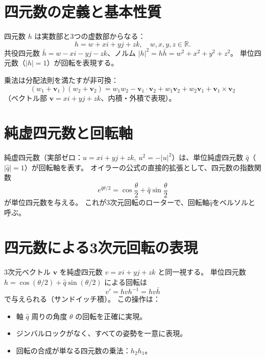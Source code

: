 \documentclass[dvipdfmx,a4paper]{jsbook}
\theoremstyle{definition}
\theoremstyle{remark}
\begin{document}
\section{四元数の定義と基本性質}
\label{sec:quaternion-definition}

四元数 $h$ は実数部と3つの虚数部からなる：
\begin{equation}
  h = w + xi + yj + zk, \quad w,x,y,z \in \mathbb{R}.
\end{equation}
共役四元数 $\bar{h} = w - xi - yj - zk$、ノルム $|h|^2 = h\bar{h} = w^2 + x^2 + y^2 + z^2$。
単位四元数（$|h|=1$）が回転を表現する。

乗法は分配法則を満たすが非可換：
\begin{equation}
  (w_1 + \mathbf{v}_1)(w_2 + \mathbf{v}_2) = w_1 w_2 - \mathbf{v}_1 \cdot \mathbf{v}_2 + w_1 \mathbf{v}_2 + w_2 \mathbf{v}_1 + \mathbf{v}_1 \times \mathbf{v}_2
\end{equation}
（ベクトル部 $\mathbf{v} = xi + yj + zk$、内積・外積で表現）。

\section{純虚四元数と回転軸}
\label{sec:pure-quaternion}

純虚四元数（実部ゼロ：$u = xi + yj + zk,\ u^2 = -|u|^2$）は、単位純虚四元数 $\hat{q}$（$|\hat{q}|=1$）が回転軸を表す。
オイラーの公式の直接的拡張として、四元数の指数関数
\begin{equation}
  e^{\hat{q}\theta/2} = \cos\frac{\theta}{2} + \hat{q} \sin\frac{\theta}{2}
\end{equation}
が単位四元数を与える。
これが3次元回転のローターで、回転軸$\hat{q}$をベルソルと呼ぶ。

\section{四元数による3次元回転の表現}
\label{sec:quaternion-rotation}

3次元ベクトル $\mathbf{v}$ を純虚四元数 $v = x i + y j + z k$ と同一視する。
単位四元数 $h = \cos(\theta/2) + \hat{q} \sin(\theta/2)$ による回転は
\begin{equation}
  v' = h v h^{-1} = h v \bar{h}
  \label{eq:quaternion-sandwich}
\end{equation}
で与えられる（サンドイッチ積）。
この操作は：
\begin{itemize}
  \item 軸 $\hat{q}$ 周りの角度 $\theta$ の回転を正確に実現。
  \item ジンバルロックがなく、すべての姿勢を一意に表現。
  \item 回転の合成が単なる四元数の乗法：$h_2 h_1$。
\end{itemize}
\end{document}
